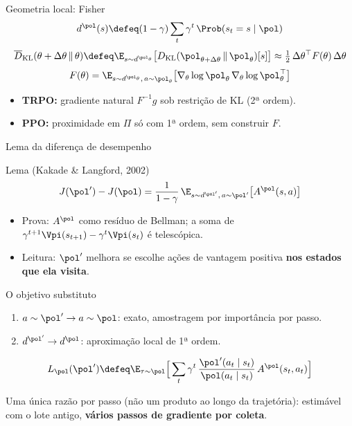 \documentclass[aspectratio=169, 11pt]{beamer}
\newcommand{\KL}{D_{\mathrm{KL}}}
\newcommand{\KLbar}{\overline{D}_{\mathrm{KL}}}
\newcommand{\azul}[1]{{\color{rlAzulClaro}#1}}
\begin{document}
\begin{frame}{Geometria local: Fisher}
  \[
    d^{\pol}(s) \defeq (1-\gamma)\sum_{t}\gamma^t\,\Prob(s_t = s\mid\pol)
  \]
  \[
    \KLbar(\theta+\Delta\theta\,\|\,\theta) \defeq \E_{s\sim d^{\pol_\theta}}\big[\KL(\pol_{\theta+\Delta\theta}\,\|\,\pol_\theta)[s]\big]
      \approx\tfrac12\,\Delta\theta^\top F(\theta)\,\Delta\theta
  \]
  \[
    F(\theta) = \E_{s\sim d^{\pol_\theta},\,a\sim\pol_\theta}\big[\nabla_\theta\log\pol_\theta\,\nabla_\theta\log\pol_\theta^\top\big]
  \]
  \begin{itemize}\small
    \item \textbf{TRPO:} gradiente natural $F^{-1}g$ sob restrição de KL (2ª ordem).
    \item \textbf{PPO:} proximidade em $\Pi$ só com 1ª ordem, sem construir $F$.
  \end{itemize}
\end{frame}

\begin{frame}{Lema da diferença de desempenho}
  \begin{teobox}{Lema (Kakade \& Langford, 2002)}
    \[
      J(\pol') - J(\pol) = \frac{1}{1-\gamma}\,\E_{s\sim d^{\pol'},\,a\sim\pol'}\big[A^{\pol}(s,a)\big]
    \]
  \end{teobox}
  \begin{itemize}\small
    \item Prova: $A^{\pol}$ como resíduo de Bellman; a soma de $\gamma^{t+1}\Vpi(s_{t+1})-\gamma^t\Vpi(s_t)$ é telescópica.
    \item Leitura: $\pol'$ melhora se escolhe ações de vantagem positiva \textbf{nos estados que ela visita}.
  \end{itemize}
\end{frame}

\begin{frame}{O objetivo substituto}
  \begin{enumerate}\small
    \item \azul{$a\sim\pol'\to a\sim\pol$}: exato, amostragem por importância por passo.
    \item {\color{rlLaranja}$d^{\pol'}\to d^{\pol}$}: aproximação local de 1ª ordem.
  \end{enumerate}
  \[
    L_{\pol}(\pol') \defeq \E_{\tau\sim\pol}\Big[\sum_{t}\gamma^t\,\frac{\pol'(a_t\mid s_t)}{\pol(a_t\mid s_t)}\,A^{\pol}(s_t,a_t)\Big]
  \]
  \begin{ideiabox}
    Uma única razão por passo (não um produto ao longo da trajetória):
    estimável com o lote antigo, \textbf{vários passos de gradiente por coleta}.
  \end{ideiabox}
\end{frame}
\end{document}
